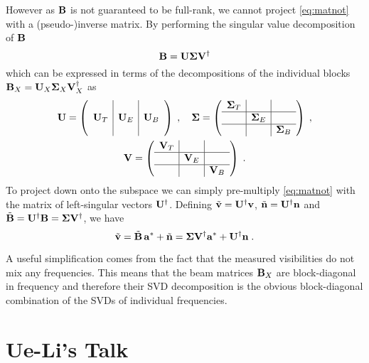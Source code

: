 \documentclass[prd,twocolumn,nofootinbib]{revtex4}
\begin{document}
However as $\mathbf{B}$ is not guaranteed to be full-rank, we cannot project
\eqref{eq:matnot} with a (pseudo-)inverse matrix. By performing the singular
value decomposition of $\mathbf{B}$
\begin{equation}
\mathbf{B} = \mathbf{U} \mathbf{\Sigma} \mathbf{V}^\dagger
\end{equation}
which can be expressed in terms of the decompositions of the individual blocks
$\mathbf{B}_X = \mathbf{U}_X \mathbf{\Sigma}_X \mathbf{V}^{\dagger}_X$ as
\begin{gather}
\mathbf{U} =  \left(\begin{array}{c|c|c} & & \\ \mathbf{U}_T & \mathbf{U}_E & \mathbf{U}_B \\ &
    &\end{array}\right) \; , \quad
\mathbf{\Sigma} =  \left(\begin{array}{c|c|c} \mathbf{\Sigma}_T & & \\ \hline & \mathbf{\Sigma}_E & \\
    \hline & & \mathbf{\Sigma}_B \end{array}\right)
 \; , \\
\mathbf{V} =  \left(\begin{array}{c|c|c} \mathbf{V}_T & & \\ \hline & \mathbf{V}_E & \\
    \hline & & \mathbf{V}_B\end{array}\right) \; .
\end{gather}
To project down onto the subspace we can simply pre-multiply \eqref{eq:matnot}
with the matrix of left-singular vectors $\mathbf{U}^\dagger$. Defining $\tilde{\mathbf{v}} =
\mathbf{U}^\dagger \mathbf{v}$, $\tilde{\mathbf{n}} = \mathbf{U}^\dagger \mathbf{n}$ and $\tilde{\mathbf{B}} = \mathbf{U}^\dagger \mathbf{B} = \mathbf{\Sigma}
\mathbf{V}^\dagger$, we have
\begin{equation}
\label{eq:matnot2}
\tilde{\mathbf{v}} = \tilde{\mathbf{B}}\, \mathbf{a}^* + \tilde{\mathbf{n}} = \mathbf{\Sigma} \mathbf{V}^\dagger \mathbf{a}^* + \mathbf{U}^\dagger \mathbf{n} \; .
\end{equation}

A useful simplification comes from the fact that the measured visibilities do
not mix any frequencies. This means that the beam matrices $\mathbf{B}_X$ are
block-diagonal in frequency and therefore their SVD decomposition is the obvious
block-diagonal combination of the SVDs of individual frequencies.


\section{Ue-Li's Talk}

\newcommand{\vlrarrow}{\ensuremath{\xrightarrow{\qquad\quad}}}
\end{document}

